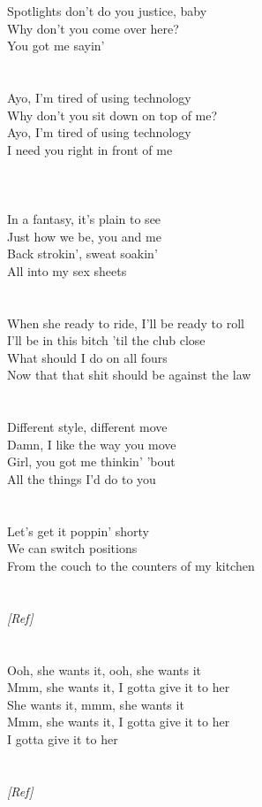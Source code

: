 {{Spotlights don't do you justice, baby\\
Why don't you come over here?\\
You got me sayin'}\\
\\\noindent\vbox{~\\
Ayo, I'm tired of using technology\\
Why don't you sit down on top of me?\\
Ayo, I'm tired of using technology\\
I need you right in front of me}\\
\\\noindent\vbox{~\\
\\
In a fantasy, it's plain to see\\
Just how we be, you and me\\
Back strokin', sweat soakin'\\
All into my sex sheets}\\
\\\noindent\vbox{~\\
When she ready to ride, I'll be ready to roll\\
I'll be in this bitch 'til the club close\\
What should I do on all fours\\
Now that that shit should be against the law}\\
\\\noindent\vbox{~\\
Different style, different move\\
Damn, I like the way you move\\
Girl, you got me thinkin' 'bout\\
All the things I'd do to you}\\
\\\noindent\vbox{~\\
Let's get it poppin' shorty\\
We can switch positions\\
From the couch to the counters of my kitchen}\\
\\\noindent\vbox{~\\
\emph{[Ref]}}\\
\\\noindent\vbox{~\\
Ooh, she wants it, ooh, she wants it\\
Mmm, she wants it, I gotta give it to her\\
She wants it, mmm, she wants it\\
Mmm, she wants it, I gotta give it to her\\
I gotta give it to her}\\
\\\noindent\vbox{~\\
\emph{[Ref]}}
}


